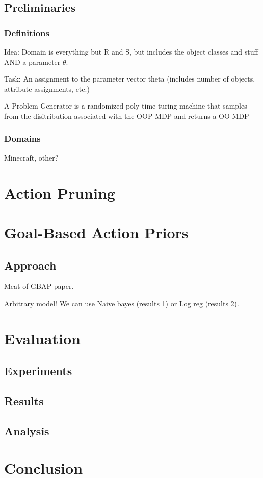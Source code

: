 \documentclass[11pt]{article}
\begin{document}
\subsection{Preliminaries}

\subsubsection{Definitions}
Idea: Domain is everything but R and S, but includes the object classes and stuff AND a parameter $\theta$.

Task: An assignment to the parameter vector theta (includes number of objects, attribute assignments, etc.)

{ A \textup{Problem Generator} is a randomized poly-time turing machine that samples from the disitribution associated with the OOP-MDP and returns a OO-MDP}

\subsubsection{Domains}

Minecraft, other?


\section{Action Pruning}
\label{sec:action_pruning}


\section{Goal-Based Action Priors}
\label{sec:gbaps}



\subsection{Approach}
Meat of GBAP paper.

Arbitrary model! We can use Naive bayes (results 1) or Log reg (results 2).





\section{Evaluation}
\label{sec:evaluation}

\subsection{Experiments}

\subsection{Results}






\subsection{Analysis}


\section{Conclusion}



\end{document}

